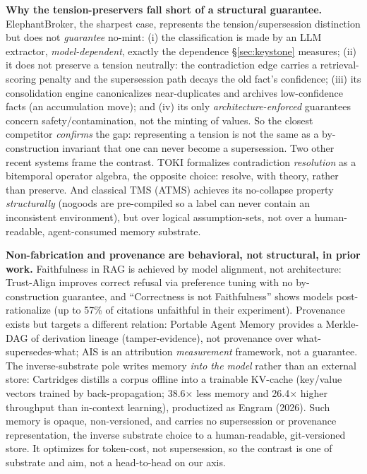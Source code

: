 \documentclass[11pt]{article}
\begin{document}
\textbf{Why the tension-preservers fall short of a structural guarantee.} ElephantBroker, the
sharpest case, represents the tension/supersession distinction but does not \emph{guarantee}
no-mint: (i) the classification is made by an LLM extractor, \emph{model-dependent}, exactly the
dependence \S\ref{sec:keystone} measures; (ii) it does not preserve a tension neutrally: the contradiction edge
carries a retrieval-scoring penalty and the supersession path decays the old fact's
confidence; (iii) its consolidation engine canonicalizes near-duplicates and archives
low-confidence facts (an accumulation move); and (iv) its only \emph{architecture-enforced}
guarantees concern safety/contamination, not the minting of values. So the closest competitor
\emph{confirms} the gap: representing a tension is not the same as a by-construction invariant that
one can never become a supersession. Two other recent systems frame the contrast. TOKI
\citep{wang2026toki} formalizes contradiction \emph{resolution} as a bitemporal operator algebra, the
opposite choice: resolve, with theory, rather than preserve. And classical TMS (ATMS) achieves
its no-collapse property \emph{structurally} (nogoods are pre-compiled so a label can never contain
an inconsistent environment), but over logical assumption-sets, not over a human-readable,
agent-consumed memory substrate.

\textbf{Non-fabrication and provenance are behavioral, not structural, in prior work.} Faithfulness
in RAG is achieved by model alignment, not architecture: Trust-Align \citep{song2024trustalign} improves
correct refusal via preference tuning with no by-construction guarantee, and ``Correctness is
not Faithfulness'' \citep{wallat2024correctness} shows models post-rationalize (up to 57\% of citations unfaithful
in their experiment). Provenance exists but targets a different relation: Portable Agent Memory
\citep{ravindran2026portable} provides a Merkle-DAG of derivation lineage (tamper-evidence), not provenance over
what-supersedes-what; AIS \citep{rashkin2021ais} is an attribution \emph{measurement} framework, not a
guarantee. The inverse-substrate pole writes memory \emph{into the model} rather than an
external store: Cartridges \citep{eyuboglu2025cartridges} distills a corpus offline into a trainable KV-cache
(key/value vectors trained by back-propagation; 38.6$\times$ less memory and 26.4$\times$ higher throughput
than in-context learning), productized as Engram (2026). Such memory is opaque, non-versioned,
and carries no supersession or provenance representation, the inverse substrate choice to a
human-readable, git-versioned store. It optimizes for token-cost, not supersession, so the
contrast is one of substrate and aim, not a head-to-head on our axis.
\end{document}
